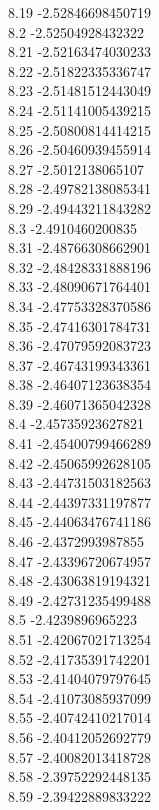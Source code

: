 {8.19	-2.52846698450719\\
8.2	-2.52504928432322\\
8.21	-2.52163474030233\\
8.22	-2.51822335336747\\
8.23	-2.51481512443049\\
8.24	-2.51141005439215\\
8.25	-2.50800814414215\\
8.26	-2.50460939455914\\
8.27	-2.5012138065107\\
8.28	-2.49782138085341\\
8.29	-2.49443211843282\\
8.3	-2.4910460200835\\
8.31	-2.48766308662901\\
8.32	-2.48428331888196\\
8.33	-2.48090671764401\\
8.34	-2.47753328370586\\
8.35	-2.47416301784731\\
8.36	-2.47079592083723\\
8.37	-2.46743199343361\\
8.38	-2.46407123638354\\
8.39	-2.46071365042328\\
8.4	-2.45735923627821\\
8.41	-2.45400799466289\\
8.42	-2.45065992628105\\
8.43	-2.44731503182563\\
8.44	-2.44397331197877\\
8.45	-2.44063476741186\\
8.46	-2.4372993987855\\
8.47	-2.43396720674957\\
8.48	-2.43063819194321\\
8.49	-2.42731235499488\\
8.5	-2.4239896965223\\
8.51	-2.42067021713254\\
8.52	-2.41735391742201\\
8.53	-2.41404079797645\\
8.54	-2.41073085937099\\
8.55	-2.40742410217014\\
8.56	-2.40412052692779\\
8.57	-2.40082013418728\\
8.58	-2.39752292448135\\
8.59	-2.39422889833222\\
}
